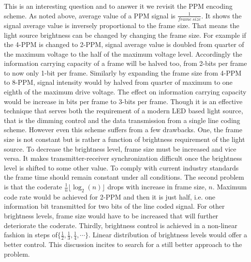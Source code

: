  This is an interesting question and to answer it we revisit the PPM encoding scheme. As noted above, average value of a PPM signal is $\frac{1}{frame~size}$. It shows the signal average value is inversely proportional to the frame size. That means the light source brightness can be changed by changing the frame size. For example if the 4-PPM is changed to 2-PPM, signal average value is doubled from quarter of the maximum voltage to the half of the maximum voltage level. Accordingly the information carrying capacity of a frame will be halved too, from 2-bits per frame to now only 1-bit per frame. Similarly by expanding the frame size from 4-PPM to 8-PPM, signal intensity would by halved from quarter of maximum to one eighth of the maximum drive voltage. The effect on information carrying capacity would be increase in bits per frame to 3-bits per frame. Though it is an effective technique that serves both the requirement of a modern LED based light source, that is the dimming control and the data transmission from a single line coding scheme. However even this scheme suffers from a few drawbacks. One, the frame size is not constant but is rather a function of brightness requirement of the light source. To decrease the brightness level, frame size must be increased and vice versa. It makes transmitter-receiver synchronization difficult once the brightness level is shifted to some other value. To comply with current industry standards the frame time should remain constant under all conditions. The second problem is that the coderate $\frac{1}{n}\lfloor \log_2(n) \rfloor$ drops with increase in frame size, $n$. Maximum code rate would be achieved for 2-PPM and then it is just half, i.e. one information bit transmitted for two bits of the line coded signal. For other brightness levels, frame size would have to be increased that will further deteriorate the coderate. Thirdly, brightness control is achieved in a non-linear fashion in steps of$\{\frac{1}{2}, \frac{1}{3}, \frac{1}{4}, \cdots \}$. Linear distribution of brightness levels would offer a better control. This discussion incites to search for a still better approach to the problem.

